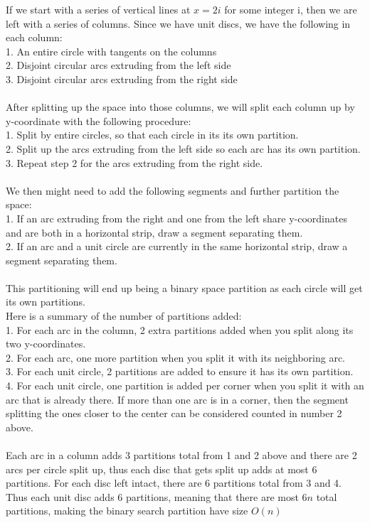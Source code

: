 \documentclass[11pt,psfig]{article}
\begin{document}
If we start with a series of vertical lines at $x=2i$ for some integer i, then we are left with a series of columns. Since we have unit discs, we have the following in each column:\\
1. An entire circle with tangents on the columns\\
2. Disjoint circular arcs extruding from the left side\\
3. Disjoint circular arcs extruding from the right side\\
\\
After splitting up the space into those columns, we will split each column up by y-coordinate with the following procedure: \\
1. Split by entire circles, so that each circle in its its own partition. \\
2. Split up the arcs extruding from the left side so each arc has its own partition. \\
3. Repeat step 2 for the arcs extruding from the right side. \\
\\
We then might need to add the following segments and further partition the space:\\
1. If an arc extruding from the right and one from the left share y-coordinates and are both in a horizontal strip, draw a segment separating them.\\
2. If an arc and a unit circle are currently in the same horizontal strip, draw a segment separating them. \\
\\
This partitioning will end up being a binary space partition as each circle will get its own partitions. \\
Here is a summary of the number of partitions added:\\
1. For each arc in the column, 2 extra partitions added when you split along its two y-coordinates. \\
2. For each arc, one more partition when you split it with its neighboring arc. \\
3. For each unit circle, 2 partitions are added to ensure it has its own partition. \\
4. For each unit circle, one partition is added per corner when you split it with an arc that is already there. If more than one arc is in a corner, then the segment splitting the ones closer to the center can be considered counted in number 2 above. \\
\\
Each arc in a column adds 3 partitions total from 1 and 2 above and there are 2 arcs per circle split up, thus each disc that gets split up adds at most 6 partitions. For each disc left intact, there are 6 partitions total from 3 and 4. Thus each unit disc adds 6 partitions, meaning that there are most $6n$ total partitions, making the binary search partition have size $O(n)$

\end{document}

